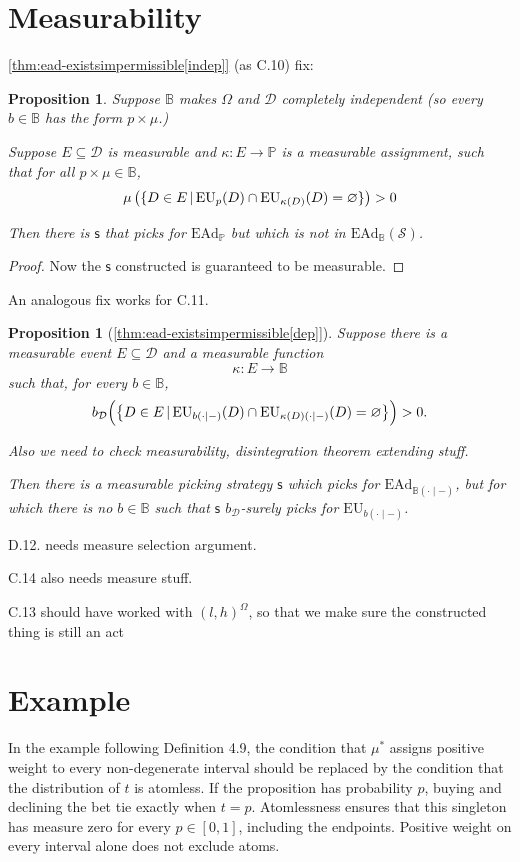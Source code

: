 \documentclass[a4paper,final]{article}
\newtheorem{proposition}[theorem]{Proposition}
\renewcommand\P{\mathbb{P}} %
\newcommand\EU{\mathrm{EU}}
\newcommand\EAd{\mathrm{EAd}}
\newcommand{\Decs}{\mathcal{D}}
\renewcommand\S{\mathcal{S}}
\newcommand\s{\mathsf{s}}
\newcommand{\IB}{\mathbb{B}}
\newcommand{\IP}{\P}
\newcommand\SetDelimiter[1][]{
	\nonscript\,#1\vert \allowbreak \nonscript\,\mathopen{}}
\providecommand\given{\SetDelimiter}
\renewcommand{\emptyset}{\varnothing}
\newenvironment{CCM rewritten}
{\begingroup\color{blue}} %
{\endgroup}              %
\begin{document}
\section{Measurability}
\cref{thm:ead-existsimpermissible[indep]} (as C.10) fix:
\begin{proposition}
Suppose $\IB$ makes $\Omega$ and $\Decs$ completely independent (so every $b\in\IB$ has the form $p\times\mu$.)

Suppose $E\subseteq\Decs$ is measurable and $\kappa:E\to\IP$ is a measurable assignment, such that for all $p\times\mu\in\IB$, 
\[
\mu\left(\{D\in E\given \EU_p(D)\cap\EU_{\kappa(D)}(D)=\emptyset\}\right)>0
\]

Then there is $\s$ that picks for $\EAd_\IP$ but which is not in $\EAd_\IB(\S)$. 
\end{proposition}
\begin{proof}
Now the $\s$ constructed is guaranteed to be measurable. 
\end{proof}
An analogous fix works for C.11. 

\begin{proposition}[\cref{thm:ead-existsimpermissible[dep]}]
Suppose there is a measurable event $E\subseteq\Decs$ and a measurable function
\[
\kappa:E\to\IB
\]
such that, for every $b\in\IB$,
\[
b_\Decs\Bigl(
\bigl\{
D\in E
\given
\EU_{b(\cdot\mid-)}(D)
\cap
\EU_{\kappa(D)(\cdot\mid-)}(D)
=
\emptyset
\bigr\}
\Bigr)
>0.
\]

Also we need to check measurability, disintegration theorem extending stuff. 

Then there is a measurable picking strategy $\s$ which picks for
$\EAd_{\IB(\cdot\mid-)}$, but for which there is no $b\in\IB$ such that
$\s$ $b_\Decs$-surely picks for $\EU_{b(\cdot\mid-)}$.
\end{proposition}


D.12. needs measure selection argument.

C.14 also needs measure stuff. 

C.13 should have worked with $(l,h)^\Omega$, so that we make sure the constructed thing is still an act

\section{Example}
In the example following Definition 4.9, the condition that \(\mu^*\) assigns positive weight to every non-degenerate interval should be replaced by the condition that the distribution of \(t\) is atomless. If the proposition has probability \(p\), buying and declining the bet tie exactly when \(t=p\). Atomlessness ensures that this singleton has measure zero for every \(p\in[0,1]\), including the endpoints. Positive weight on every interval alone does not exclude atoms.
\end{document}
